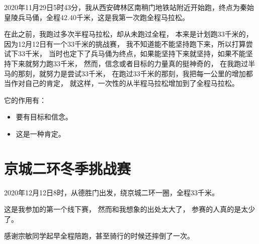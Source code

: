 2020年11月29日5时43分，我从西安碑林区南稍门地铁站附近开始跑，终点为秦始皇陵兵马俑，全程42.40千米，这是我第一次跑全程马拉松。

在此之前，我跑过多次半程马拉松，却从未跑过全程，
本来是计划跑33千米的，因为12月12日有一个33千米的挑战赛，
我不知道能不能坚持跑下来，所以打算尝试下33千米，
当时也定下了兵马俑为终点，如果能坚持下来就坚持，如果不能坚持下来就努力跑33千米，
然而，信念或者目标的力量真的挺神奇的，
在我跑过半马的那刻，就努力是尝试33千米，
在跑过33千米的那刻，我把每一公里的增加都当作对自己的肯定，
就这样，一次性的从半程马拉松增加到了全程马拉松。

它的作用有：
\begin{itemize}
\item 要有目标和信念。
\item 这是一种肯定。
\end{itemize}

\section{京城二环冬季挑战赛}

2020年12月12日8时，从德胜门出发，绕京城二环一圈，全程33千米。

这是我参加的第一个线下赛，
然而和我想象的出处太大了，
参赛的人真的是太少了。


感谢宗敏同学起早全程陪跑，甚至骑行的时候还摔倒了一次。